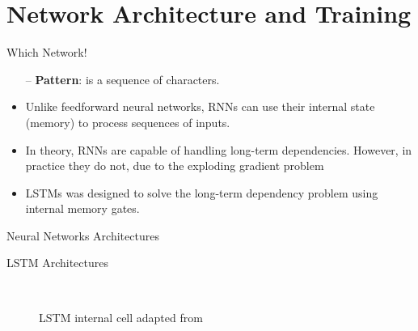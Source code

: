 \section{Network Architecture and Training}

\begin{frame}[fragile]{Which Network!}


		\begin{itemize}
			\item[--] \textbf{Pattern}: is a sequence of characters.
			\item  Unlike feedforward neural networks, RNNs can use their internal state (memory) to process sequences of inputs.
			\item In theory, RNNs are capable of handling long-term dependencies. 	However, in practice they do not, due to the \alert{exploding gradient problem}
			\item LSTMs was designed to solve the long-term dependency problem using internal memory gates.
		\end{itemize}
		
\end{frame}
\begin{frame}[fragile]{Neural Networks Architectures}
\begin{center}
	\begin{figure}[t]
		
	\end{figure}%
\end{center}
\end{frame}


\begin{frame}[fragile]{LSTM Architectures}
\begin{center}
\begin{figure}[t]
	
	\endminipage
	\caption{LSTM internal cell adapted from~\cite{colah}}~\label{Fig:LSTM_Cell_Chaining}
\end{figure}%
\end{center}
\end{frame}


